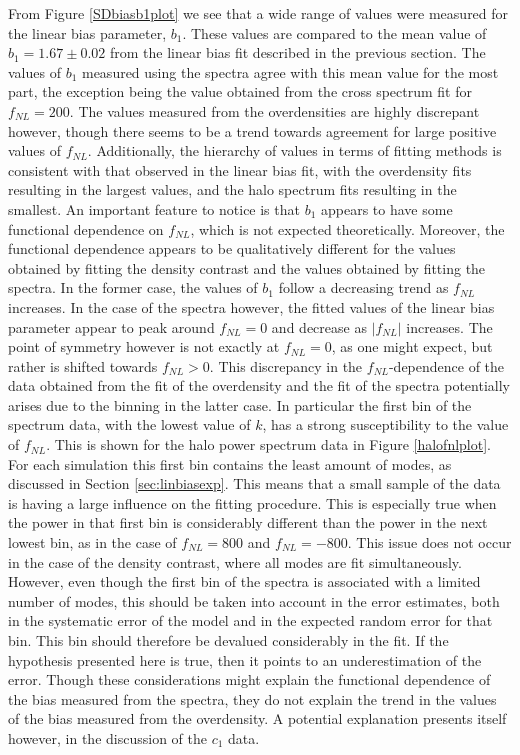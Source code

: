 \documentclass[10pt,letterpaper,final]{iopart}
\numberwithin{equation}{subsection}
\begin{document}
From Figure \ref{SDbiasb1plot} we see that a wide range of values were measured for the linear bias parameter, $b_1$. These values are compared to the mean value of $b_1 = 1.67 \pm 0.02$ from the linear bias fit described in the previous section. The values of $b_1$ measured using the spectra agree with this mean value for the most part, the exception being the value obtained from the cross spectrum fit for $f_{NL} = 200$. The values measured from the overdensities are highly discrepant however, though there seems to be a trend towards agreement for large positive values of $f_{NL}$. Additionally, the hierarchy of values in terms of fitting methods is consistent with that observed in the linear bias fit, with the overdensity fits resulting in the largest values, and the halo spectrum fits resulting in the smallest. An important feature to notice is that $b_1$ appears to have some functional dependence on $f_{NL}$, which is not expected theoretically. Moreover, the functional dependence appears to be qualitatively different for the values obtained by fitting the density contrast and the values obtained by fitting the spectra. In the former case, the values of $b_1$ follow a decreasing trend as $f_{NL}$ increases. In the case of the spectra however, the fitted values of the linear bias parameter appear to peak around $f_{NL} = 0$ and decrease as $| f_{NL} |$ increases. The point of symmetry however is not exactly at $f_{NL} = 0$, as one might expect, but rather is shifted towards $f_{NL} > 0$.  This discrepancy in the $f_{NL}$-dependence of the data obtained from the fit of the overdensity and the fit of the spectra potentially arises due to the binning in the latter case. In particular the first bin of the spectrum data, with the lowest value of $k$, has a strong susceptibility to the value of $f_{NL}$. This is shown for the halo power spectrum data in Figure \ref{halofnlplot}. For each simulation this first bin contains the least amount of modes, as discussed in Section \ref{sec:linbiasexp}. This means that a small sample of the data is having a large influence on the fitting procedure. This is especially true when the power in that first bin is considerably different than the power in the next lowest bin, as in the case of $f_{NL} = 800$ and $f_{NL} = -800$. This issue does not occur in the case of the density contrast, where all modes are fit simultaneously. However, even though the first bin of the spectra is associated with a limited number of modes, this should be taken into account in the error estimates, both in the systematic error of the model and in the expected random error for that bin. This bin should therefore be devalued considerably in the fit. If the hypothesis presented here is true, then it points to an underestimation of the error. Though these considerations might explain the functional dependence of the bias measured from the spectra, they do not explain the trend in the values of the bias measured from the overdensity. A potential explanation presents itself however, in the discussion of the $c_1$ data. 
\end{document}

